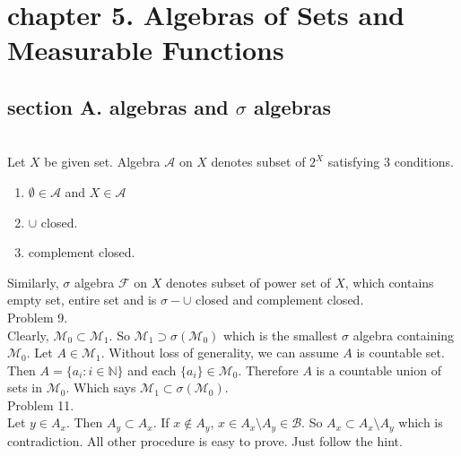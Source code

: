 \section*{chapter 5. Algebras of Sets and Measurable Functions}
\subsection*{section A. algebras and $\sigma$ algebras} \hfill \\

Let $X$ be given set. Algebra $\mathcal{A}$ on $X$ denotes subset of $2^{X}$ satisfying 3 conditions.
\begin{enumerate}
	\item $\emptyset \in \mathcal{A}$ and $X\in \mathcal{A}$
	\item $\cup$ closed.
	\item complement closed.
\end{enumerate}

Similarly, $\sigma$ algebra $\mathcal{F}$ on $X$ denotes subset of power set of $X$, which contains empty set, entire set and is $\sigma -\cup$ closed and complement closed.\\

Problem 9. \\

Clearly, $\mathcal{M}_{0} \subset \mathcal{M}_{1}$. So $\mathcal{M}_{1} \supset \sigma \left (\mathcal{M}_{0} \right ) $ which is the smallest $\sigma$ algebra containing $\mathcal{M}_{0}$.
Let $A \in \mathcal{M}_{1}$. Without loss of generality, we can assume $A$ is countable set. Then $A = \{ a_i : i \in \mathbb{N} \}$ and each $\{ a_i \} \in \mathcal{M}_{0}$. Therefore $A$ is a countable union of sets in $\mathcal{M}_{0}$. Which says $\mathcal{M}_{1} \subset \sigma \left ( \mathcal{M}_{0} \right ) $.\\

Problem 11. \\

Let $y \in A_x$. Then $A_y \subset A_x$. If $x \notin A_y$, $x \in A_x \setminus A_y \in \mathcal{B}$. So $A_x \subset A_x \setminus A_y$ which is contradiction. All other procedure is easy to prove. Just follow the hint. \\
